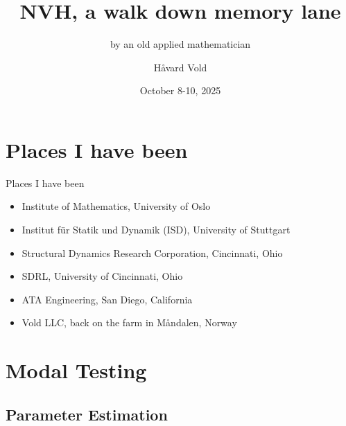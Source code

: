 \documentclass[aspectratio=169,10pt]{beamer} \mode<presentation>
\title{NVH, a walk down memory lane}
\subtitle{by an old applied mathematician}
\author{H\aa vard Vold}
\institute{Vold LLC}
\date{October 8-10, 2025}
\begin{document}
\maketitle

\section[Outline]{}


\section{Places I have been}
\begin{frame}[t]{Places I have been}
  \begin{itemize}[<+->]
    \item Institute of Mathematics, University of Oslo
    \item Institut f\"u{}r Statik und Dynamik (ISD), University of Stuttgart
    \item Structural Dynamics Research Corporation, Cincinnati, Ohio
    \item SDRL, University of Cincinnati, Ohio
    \item ATA Engineering, San Diego, California
    \item Vold LLC, back on the farm in M\aa{}ndalen, Norway
  \end{itemize}
\end{frame}

\section{Modal Testing}

\subsection{Parameter Estimation}
\end{document}
